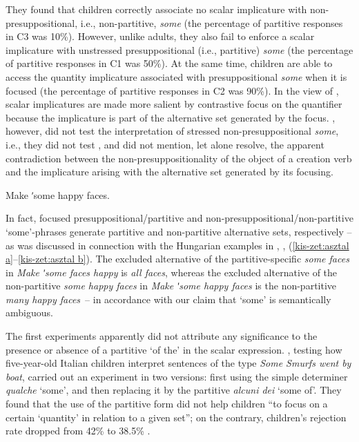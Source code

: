 \documentclass[output=paper]{langscibook}
\begin{document}
\noindent They found that children correctly associate no scalar implicature with non-pre\-suppositional, i.e., non-partitive, \textit{some} (the percentage of partitive responses in C3 was 10\%). However, unlike adults, they also fail to enforce a scalar implicature with unstressed presuppositional (i.e., partitive) \textit{some} (the percentage of partitive responses in C1 was 50\%). At the same time, children are able to access the quantity implicature associated with presuppositional \textit{some} when it is focused (the percentage of partitive responses in C2 was 90\%). In the view of \citeauthor{miller2005young}, scalar implicatures are made more salient by contrastive focus on the quantifier because the implicature is part of the alternative set generated by the focus. \citeauthor{miller2005young}, however, did not test the interpretation of stressed non-presuppositional \textit{some}, i.e., they did not test , and did not mention, let alone resolve, the apparent contradiction between the non-presuppositionality of the object of a creation verb and the implicature arising with the alternative set generated by its focusing. 

\ea Make ʹsome happy faces. \label{kis-zet:happy faces}
\z

\noindent In fact, focused presuppositional/partitive and non-presuppositional/non-par\-ti\-tive `some'-phrases generate partitive and non-partitive alternative sets, respectively – as was discussed in connection with the Hungarian examples in , , (\ref{kis-zet:asztal a}--\ref{kis-zet:asztal b}). The excluded alternative of the partitive-specific \textit{some faces} in \textit{Make ʹsome faces happy} is \textit{all faces}, whereas the excluded alternative of the non-par\-ti\-tive \textit{some happy faces} in \textit{Make ʹsome happy faces} is the non-partitive \textit{many happy faces}~– in accordance with our claim that `some' is semantically ambiguous.

The first experiments apparently did not attribute any significance to the presence or absence of a partitive `of the' in the scalar expression. \citet{foppolo2012scalar}, testing how five-year-old Italian children interpret sentences of the type \textit{Some Smurfs went by boat}, carried out an experiment in two versions: first using the simple determiner \textit{qualche} `some', and then replacing it by the partitive \textit{alcuni dei} `some of'. They found that the use of the partitive form did not help children “to focus on a certain `quantity' in relation to a given set”; on the contrary, children’s rejection rate dropped from 42\% to 38.5\% \citep[371]{foppolo2012scalar}. 
\end{document}
